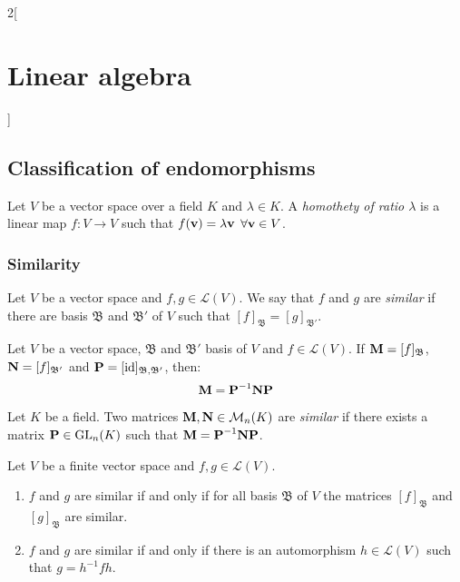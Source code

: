 \documentclass[../../../main.tex]{subfiles}
\begin{document}
\begin{multicols}{2}[\section{Linear algebra}]
    \subsection{Classification of endomorphisms}
    \begin{definition}
        Let $V$ be a vector space over a field $K$ and $\lambda\in K$. A \textit{homothety of ratio $\lambda$} is a linear map $f:V\rightarrow V$ such that $f(\boldsymbol{\mathrm{v}})=\lambda\boldsymbol{\mathrm{v}}$ $\forall\boldsymbol{\mathrm{v}}\in V$.
    \end{definition}
    \subsubsection*{Similarity}
    \begin{definition}
        Let $V$ be a vector space and $f,g\in\mathcal{L}(V)$. We say that $f$ and $g$ are \textit{similar} if there are basis $\mathfrak{B}$ and $\mathfrak{B}'$ of $V$ such that $[f]_\mathfrak{B}=[g]_{\mathfrak{B}'}$.
    \end{definition}
    \begin{lemma}
        Let $V$ be a vector space, $\mathfrak{B}$ and $\mathfrak{B}'$ basis of $V$ and $f\in\mathcal{L}(V)$. If $\boldsymbol{\mathrm{M}}=[f]_\mathfrak{B}$, $\boldsymbol{\mathrm{N}}=[f]_{\mathfrak{B}'}$ and $\boldsymbol{\mathrm{P}}=[\mathrm{id}]_{\mathfrak{B},\mathfrak{B}'}$, then: $$\boldsymbol{\mathrm{M}}=\boldsymbol{\mathrm{P}}^{-1}\boldsymbol{\mathrm{N}}\boldsymbol{\mathrm{P}}$$
    \end{lemma}
    \begin{definition}
        Let $K$ be a field. Two matrices $\boldsymbol{\mathrm{M}}, \boldsymbol{\mathrm{N}}\in\mathcal{M}_n(K)$ are \textit{similar} if there exists a matrix $\boldsymbol{\mathrm{P}}\in\mathrm{GL}_n(K)$ such that $\boldsymbol{\mathrm{M}}=\boldsymbol{\mathrm{P}}^{-1}\boldsymbol{\mathrm{N}}\boldsymbol{\mathrm{P}}$.
    \end{definition}
    \begin{prop}
        Let $V$ be a finite vector space and $f,g\in\mathcal{L}(V)$.
        \begin{enumerate}
            \item $f$ and $g$ are similar if and only if for all basis $\mathfrak{B}$ of $V$ the matrices $[f]_\mathfrak{B}$ and $[g]_\mathfrak{B}$ are similar.
            \item $f$ and $g$ are similar if and only if there is an automorphism $h\in\mathcal{L}(V)$ such that $g=h^{-1}fh$.
        \end{enumerate}
    \end{prop}

\end{multicols}
\end{document}
